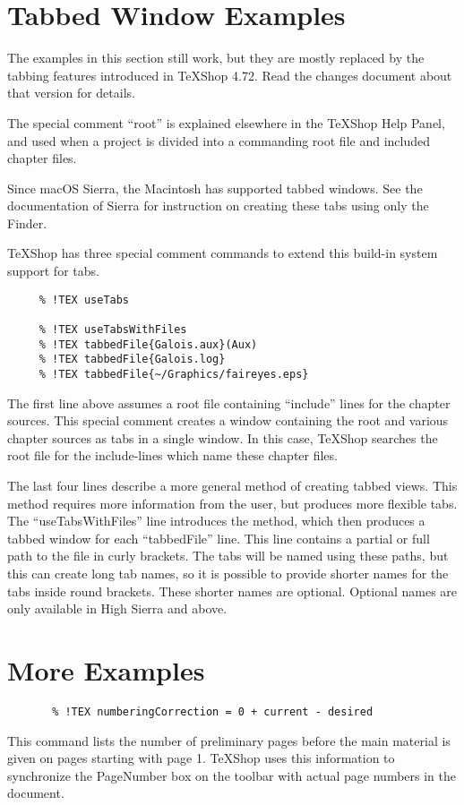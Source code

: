 \documentclass[11pt, oneside]{article}   	%
\begin{document}
 \section{Tabbed Window Examples}
 
 The examples in this section still work, but they are mostly replaced by the tabbing features introduced in TeXShop 4.72. Read the changes document about that version for details.
  
 The special comment ``root'' is explained elsewhere in the TeXShop Help Panel, and used when a project is divided into a commanding root file and included chapter files. 
 
 Since macOS Sierra, the Macintosh has supported tabbed windows. See the documentation of Sierra for  instruction on creating these tabs using only the Finder. 
  
 TeXShop has three special comment commands to extend this build-in system support for tabs. 
 
 \begin{verbatim}
     % !TEX useTabs
	
     % !TEX useTabsWithFiles
     % !TEX tabbedFile{Galois.aux}(Aux)
     % !TEX tabbedFile{Galois.log}
     % !TEX tabbedFile{~/Graphics/faireyes.eps}
 \end{verbatim}
 The first line above assumes a root file containing ``include'' lines for the chapter sources. This special comment creates a window containing the root and various chapter sources as tabs in a single window.
 In this case, TeXShop searches the root file for the include-lines which name these chapter files.
 
 The last four lines describe a more general method of creating tabbed views. This method requires more
 information from the user, but produces more flexible tabs. The ``useTabsWithFiles'' line introduces the method, which then produces a tabbed window for each ``tabbedFile'' line. This line contains a partial or full path to the file in curly brackets. The tabs will be named using these paths, but this can create long tab names, so it is possible to provide  shorter names for the tabs inside round brackets. These
 shorter names are optional. Optional names are only available in High Sierra and above.
 
 \newpage
 \section{More Examples}
 \begin{verbatim}
       % !TEX numberingCorrection = 0 + current - desired 
 \end{verbatim}
This command lists the number of preliminary pages before the main material is given on pages starting with page 1. 
TeXShop uses this information to synchronize the PageNumber box on the toolbar with actual page numbers in the document.
\end{document}

